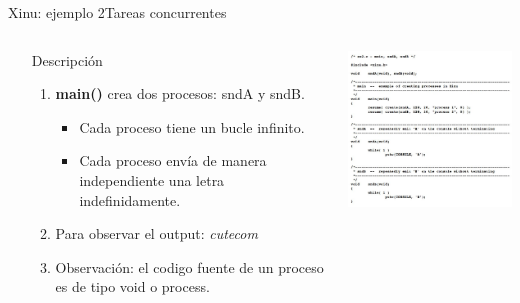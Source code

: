 \documentclass[8pt,aspectratio=169,compress]{beamer}
\begin{document}
\begin{frame}[fragile]{Xinu: ejemplo 2}{Tareas concurrentes}

    \begin{columns}[onlytextwidth,T]
      \column{\dimexpr\linewidth-70mm-5mm}

\begin{small}
	\begin{itemize}
\bigskip
  \item[Descripción]
\begin{enumerate}
\item \textbf{main()} crea dos procesos: sndA y sndB.
	\begin{itemize}
\item Cada proceso tiene un bucle infinito.
\item Cada proceso envía de manera independiente una letra indefinidamente.
	\end{itemize}

\bigskip
\item Para observar el output: \textit{cutecom}
\bigskip
\item Observación: el codigo fuente de un proceso es de tipo void o process.
\end{enumerate}
	\end{itemize}

\end{small}

      \column{70mm}
     \includegraphics[width=70mm]{images/ejemplo2.jpg}

    \end{columns}
\end{frame}
\end{document}
